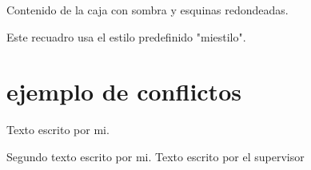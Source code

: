 \documentclass[b5paper, 10pt]{book}
\begin{document}
\begin{tcolorbox}[
	colback=yellow!10,           %
	colframe=orange!80!black,    %
	title=Advertencia,           %
	fonttitle=\bfseries,         %
	coltitle=white,              %
	rounded corners,             %
	boxrule=1.5pt,               %
	]
	Contenido de la caja con sombra y esquinas redondeadas.
\end{tcolorbox}

\begin{tcolorbox}[miestilo, title=Nota importante]
	Este recuadro usa el estilo predefinido "miestilo".
\end{tcolorbox}


\section {ejemplo de conflictos}
Texto escrito por mi.

Segundo texto escrito por mi. Texto escrito por el supervisor

\balance
\begin{doublespace}
	\begin{footnotesize}
		\begin{twocolumn}
			
		\end{twocolumn}
	\end{footnotesize}
\end{doublespace}
\end{document}
